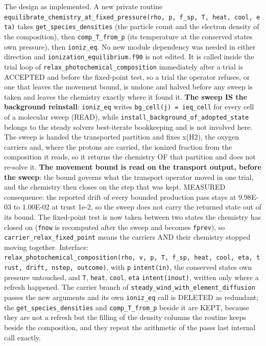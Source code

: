 \documentclass[english,a4paper]{my_memo}
\begin{document}
\begin{itemize}
  The design as implemented. A new private routine
  \texttt{equilibrate\_chemistry\_at\_fixed\_pressure(rho,\ p,\ f\_sp,\ T,\ heat,\ cool,\ eta)}
  takes \texttt{get\_species\_densities} (the particle count and the electron density of
  the composition), then \texttt{comp\_T\_from\_p} (its temperature at the conserved
  state\textquotesingle s own pressure), then \texttt{ioniz\_eq}. No new module dependency was needed in
  either direction and \texttt{ionization\_equilibrium.f90} is not edited. It is called
  inside the trial loop of \texttt{relax\_photochemical\_composition} immediately after a
  trial is ACCEPTED and before the fixed-point test, so a trial the operator
  refuses, or one that leaves the movement bound, is undone and halved before
  any sweep is taken and leaves the chemistry exactly where it found it. \textbf{The
  sweep IS the background reinstall}: \texttt{ioniz\_eq} writes \texttt{bg\_cell(j)\ =\ ieq\_cell} for every cell of a molecular sweep (READ), while
  \texttt{install\_background\_of\_adopted\_state} belongs to the steady solver\textquotesingle s
  best-iterate bookkeeping and is not involved here. The sweep is handed the
  transported partition and fixes x(H2), the oxygen carriers and, where the
  protons are carried, the ionized fraction from the composition it reads, so it
  returns the chemistry OF that partition and does not re-solve it. \textbf{The
  movement bound is read on the transport output, before the sweep}: the bound
  governs what the transport operator moved in one trial, and the chemistry then
  closes on the step that was kept. MEASURED consequence: the reported drift of
  every bounded production pass stays at 9.98E-03 to 1.00E-02 at trust 1e-2, so
  the sweep does not carry the returned state out of its bound. The fixed-point
  test is now taken between two states the chemistry has closed on (\texttt{fnow} is
  recomputed after the sweep and becomes \texttt{fprev}), so \texttt{carrier\_relax\_fixed\_point}
  means the carriers AND their chemistry stopped moving together. Interface:
  \texttt{relax\_photochemical\_composition(rho,\ v,\ p,\ T,\ f\_sp,\ heat,\ cool,\ eta,\ trust,\ drift,\ nstep,\ outcome)}, with \texttt{p} \texttt{intent(in)}, the conserved state\textquotesingle s own
  pressure untouched, and \texttt{T}, \texttt{heat}, \texttt{cool}, \texttt{eta} \texttt{intent(inout)}, written
  only where a refresh happened. The carrier branch of
  \texttt{steady\_wind\_with\_element\_diffusion} passes the new arguments and its own
  \texttt{ioniz\_eq} call is DELETED as redundant; the \texttt{get\_species\_densities} and
  \texttt{comp\_T\_from\_p} beside it are KEPT, because they are not a refresh but the
  filling of the density columns the routine keeps beside the composition, and
  they repeat the arithmetic of the pass\textquotesingle s last internal call exactly.


\end{itemize}
\end{document}
